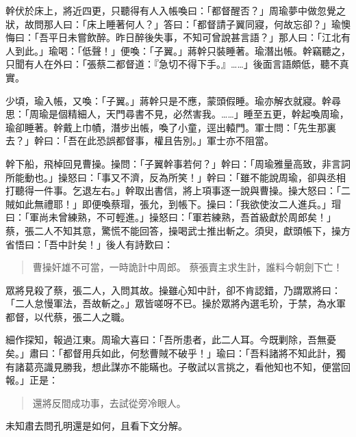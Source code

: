 幹伏於床上，將近四更，只聽得有人入帳喚曰：「都督醒否？」周瑜夢中做忽覺之狀，故問那人曰：「床上睡著何人？」答曰：「都督請子翼同寢，何故忘卻？」瑜懊悔曰：「吾平日未嘗飲醉。昨日醉後失事，不知可曾說甚言語？」那人曰：「江北有人到此。」瑜喝：「低聲！」便喚：「子翼。」蔣幹只裝睡著。瑜潛出帳。幹竊聽之，只聞有人在外曰：「張蔡二都督道：『急切不得下手。』……」後面言語頗低，聽不真實。

少頃，瑜入帳，又喚：「子翼。」蔣幹只是不應，蒙頭假睡。瑜亦解衣就寢。幹尋思：「周瑜是個精細人，天門尋書不見，必然害我。……」睡至五更，幹起喚周瑜，瑜卻睡著。幹戴上巾幘，潛步出帳，喚了小童，逕出轅門。軍士問：「先生那裏去？」幹曰：「吾在此恐誤都督事，權且告別。」軍士亦不阻當。

幹下船，飛棹回見曹操。操問：「子翼幹事若何？」幹曰：「周瑜雅量高致，非言詞所能動也。」操怒曰：「事又不濟，反為所笑！」幹曰：「雖不能說周瑜，卻與丞相打聽得一件事。乞退左右。」幹取出書信，將上項事逐一說與曹操。操大怒曰：「二賊如此無禮耶！」即便喚蔡瑁，張允，到帳下。操曰：「我欲使汝二人進兵。」瑁曰：「軍尚未曾練熟，不可輕進。」操怒曰：「軍若練熟，吾首級獻於周郎矣！」蔡，張二人不知其意，驚慌不能回答，操喝武士推出斬之。須臾，獻頭帳下，操方省悟曰：「吾中計矣！」後人有詩歎曰：

\begin{quote}
曹操奸雄不可當，一時詭計中周郎。
蔡張賣主求生計，誰料今朝劍下亡！
\end{quote}

眾將見殺了蔡，張二人，入問其故。操雖心知中計，卻不肯認錯，乃謂眾將曰：「二人怠慢軍法，吾故斬之。」眾皆嗟呀不已。操於眾將內選毛玠，于禁，為水軍都督，以代蔡，張二人之職。

細作探知，報過江東。周瑜大喜曰：「吾所患者，此二人耳。今既剿除，吾無憂矣。」肅曰：「都督用兵如此，何愁曹賊不破乎！」瑜曰：「吾料諸將不知此計，獨有諸葛亮識見勝我，想此謀亦不能瞞也。子敬試以言挑之，看他知也不知，便當回報。」正是：

\begin{quote}
還將反間成功事，去試從旁冷眼人。
\end{quote}

未知肅去問孔明還是如何，且看下文分解。
